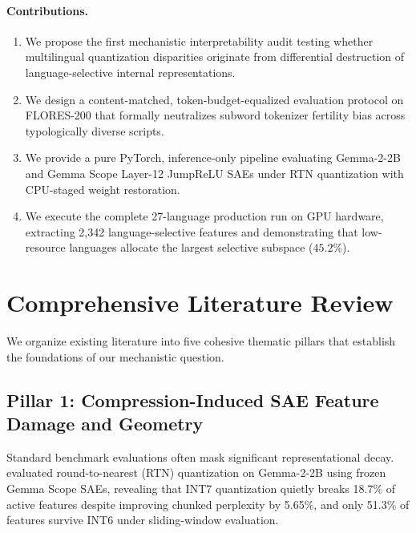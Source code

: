 \documentclass[11pt]{article}
\begin{document}
\paragraph{Contributions.}
\begin{enumerate}
    \item We propose the first mechanistic interpretability audit testing whether multilingual quantization disparities originate from differential destruction of language-selective internal representations.
    \item We design a content-matched, token-budget-equalized evaluation protocol on FLORES-200 that formally neutralizes subword tokenizer fertility bias across typologically diverse scripts.
    \item We provide a pure PyTorch, inference-only pipeline evaluating Gemma-2-2B and Gemma Scope Layer-12 JumpReLU SAEs under RTN quantization with CPU-staged weight restoration.
    \item We execute the complete 27-language production run on GPU hardware, extracting 2,342 language-selective features and demonstrating that low-resource languages allocate the largest selective subspace ($45.2\%$).
\end{enumerate}

\section{Comprehensive Literature Review}
We organize existing literature into five cohesive thematic pillars that establish the foundations of our mechanistic question.

\subsection{Pillar 1: Compression-Induced SAE Feature Damage and Geometry}
Standard benchmark evaluations often mask significant representational decay. \citet{duan2026perplexity} evaluated round-to-nearest (RTN) quantization on Gemma-2-2B using frozen Gemma Scope SAEs, revealing that INT7 quantization quietly breaks 18.7\% of active features despite improving chunked perplexity by 5.65\%, and only 51.3\% of features survive INT6 under sliding-window evaluation. 
\end{document}
